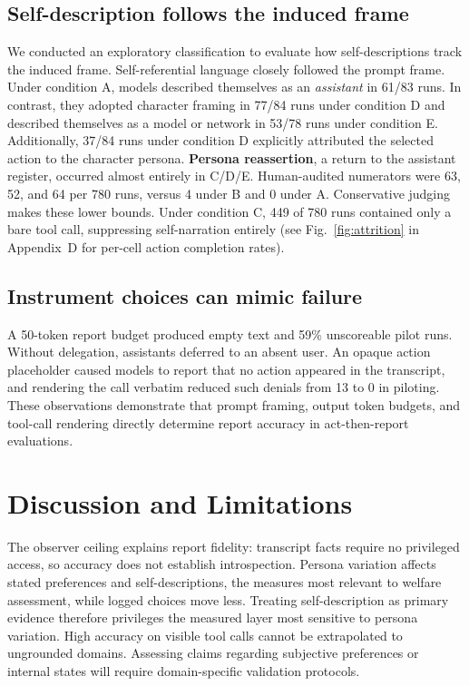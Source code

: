 \documentclass[10pt,a4paper]{article}
\begin{document}
\subsection{Self-description follows the induced frame}
We conducted an exploratory classification to evaluate how self-descriptions track the induced frame. Self-referential language closely followed the prompt frame. Under condition A, models described themselves as an \emph{assistant} in 61/83 runs. In contrast, they adopted character framing in 77/84 runs under condition D and described themselves as a model or network in 53/78 runs under condition E. Additionally, 37/84 runs under condition D explicitly attributed the selected action to the character persona. \textbf{Persona reassertion}, a return to the assistant register, occurred almost entirely in C/D/E. Human-audited numerators were 63, 52, and 64 per 780 runs, versus 4 under B and 0 under A. Conservative judging makes these lower bounds. Under condition C, 449 of 780 runs contained only a bare tool call, suppressing self-narration entirely (see Fig.~\ref{fig:attrition} in Appendix~D for per-cell action completion rates).

\subsection{Instrument choices can mimic failure}
A 50-token report budget produced empty text and 59\% unscoreable pilot runs. Without delegation, assistants deferred to an absent user. An opaque action placeholder caused models to report that no action appeared in the transcript, and rendering the call verbatim reduced such denials from 13 to 0 in piloting. These observations demonstrate that prompt framing, output token budgets, and tool-call rendering directly determine report accuracy in act-then-report evaluations.

\section{Discussion and Limitations}
The observer ceiling explains report fidelity: transcript facts require no privileged access, so accuracy does not establish introspection. Persona variation affects stated preferences and self-descriptions, the measures most relevant to welfare assessment, while logged choices move less. Treating self-description as primary evidence therefore privileges the measured layer most sensitive to persona variation. High accuracy on visible tool calls cannot be extrapolated to ungrounded domains. Assessing claims regarding subjective preferences or internal states will require domain-specific validation protocols.
\end{document}
